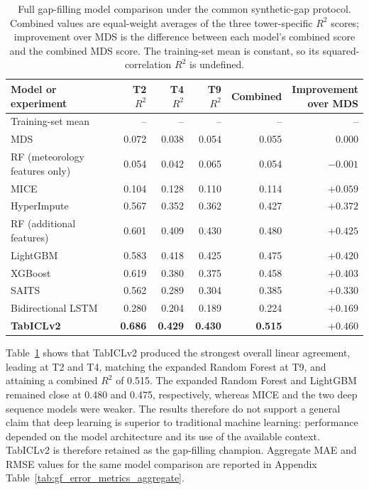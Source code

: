 \begin{table}[htbp]
\centering
\footnotesize
\begin{tabular*}{\textwidth}{@{\extracolsep{\fill}}lrrrrr@{}}
\toprule
Model or experiment & T2 $R^2$ & T4 $R^2$ & T9 $R^2$ & Combined & \shortstack{Improvement\\over MDS} \\
\midrule
Training-set mean & -- & -- & -- & -- & -- \\
MDS & 0.072 & 0.038 & 0.054 & 0.055 & 0.000 \\
RF (meteorology features only) & 0.054 & 0.042 & 0.065 & 0.054 & $-0.001$ \\
MICE & 0.104 & 0.128 & 0.110 & 0.114 & $+0.059$ \\
HyperImpute & 0.567 & 0.352 & 0.362 & 0.427 & $+0.372$ \\
RF (additional features) & 0.601 & 0.409 & 0.430 & 0.480 & $+0.425$ \\
LightGBM & 0.583 & 0.418 & 0.425 & 0.475 & $+0.420$ \\
XGBoost & 0.619 & 0.380 & 0.375 & 0.458 & $+0.403$ \\
SAITS & 0.562 & 0.289 & 0.304 & 0.385 & $+0.330$ \\
Bidirectional LSTM & 0.280 & 0.204 & 0.189 & 0.224 & $+0.169$ \\
\textbf{TabICLv2} & \textbf{0.686} & \textbf{0.429} & \textbf{0.430} & \textbf{0.515} & $\mathbf{+0.460}$ \\
\bottomrule
\end{tabular*}
\caption{Full gap-filling model comparison under the common synthetic-gap
protocol. Combined values are equal-weight averages of the three
tower-specific \(R^2\) scores; improvement over MDS is the difference between
each model's combined score and the combined MDS score. The training-set mean
is constant, so its squared-correlation \(R^2\) is undefined.}
\label{tab:gf_model_comparison}
\end{table}

Table~\ref{tab:gf_model_comparison} shows that TabICLv2 produced the strongest
overall linear agreement, leading at T2 and T4, matching the expanded Random
Forest at T9, and attaining a combined \(R^2\) of 0.515. The
expanded Random Forest and LightGBM remained close at 0.480 and 0.475,
respectively, whereas MICE and the two deep sequence models were weaker. The
results therefore do not support a general claim that deep learning is
superior to traditional machine learning: performance depended on the model
architecture and its use of the available context. TabICLv2 is therefore
retained as the gap-filling champion.
Aggregate MAE and RMSE values for the same model comparison are reported in
Appendix Table~\ref{tab:gf_error_metrics_aggregate}.

